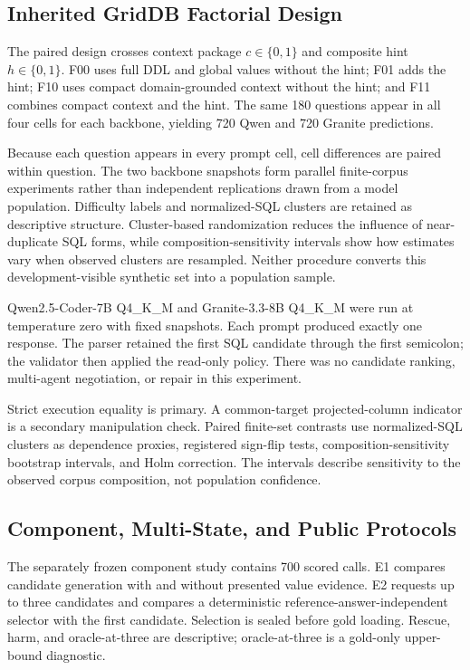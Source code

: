 \documentclass[applsci,article,submit,moreauthors]{Definitions/mdpi}
\begin{document}
\subsection{Inherited GridDB Factorial Design}

The paired design crosses context package $c\in\{0,1\}$ and composite hint $h\in\{0,1\}$. F00 uses full DDL and global values without the hint; F01 adds the hint; F10 uses compact domain-grounded context without the hint; and F11 combines compact context and the hint. The same 180 questions appear in all four cells for each backbone, yielding 720 Qwen and 720 Granite predictions.

Because each question appears in every prompt cell, cell differences are paired within question. The two backbone snapshots form parallel finite-corpus experiments rather than independent replications drawn from a model population. Difficulty labels and normalized-SQL clusters are retained as descriptive structure. Cluster-based randomization reduces the influence of near-duplicate SQL forms, while composition-sensitivity intervals show how estimates vary when observed clusters are resampled. Neither procedure converts this development-visible synthetic set into a population sample.

Qwen2.5-Coder-7B Q4\_K\_M and Granite-3.3-8B Q4\_K\_M were run at temperature zero with fixed snapshots. Each prompt produced exactly one response. The parser retained the first SQL candidate through the first semicolon; the validator then applied the read-only policy. There was no candidate ranking, multi-agent negotiation, or repair in this experiment.

Strict execution equality is primary. A common-target projected-column indicator is a secondary manipulation check. Paired finite-set contrasts use normalized-SQL clusters as dependence proxies, registered sign-flip tests, composition-sensitivity bootstrap intervals, and Holm correction. The intervals describe sensitivity to the observed corpus composition, not population confidence.

\subsection{Component, Multi-State, and Public Protocols}

The separately frozen component study contains 700 scored calls. E1 compares candidate generation with and without presented value evidence. E2 requests up to three candidates and compares a deterministic reference-answer-independent selector with the first candidate. Selection is sealed before gold loading. Rescue, harm, and oracle-at-three are descriptive; oracle-at-three is a gold-only upper-bound diagnostic.
\end{document}
